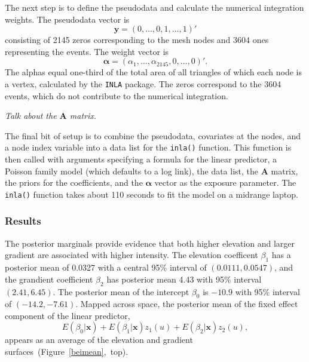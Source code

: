 \documentclass[]{interact}
\begin{document}
The next step is to define the pseudodata and calculate the numerical
integration weights. The pseudodata vector is
\begin{displaymath}
\mathbf{y} = (0, \dots, 0, 1, \dots, 1)'
\end{displaymath}
consisting of 2145 zeros corresponding to the mesh nodes and 3604 ones
representing the events. The weight vector is
\begin{displaymath}
\boldsymbol{\alpha} = (\alpha_{1}, \dots, \alpha_{2145}, 0, \dots, 0)'.
\end{displaymath}
The alphas equal one-third of the total area of all triangles of which each
node is a vertex, calculated by the \texttt{INLA} package. The zeros
correspond to the 3604 events, which do not contribute to the numerical
integration.

{\it Talk about the \(\mathbf{A}\) matrix.}

The final bit of setup is to combine the pseudodata, covariates at the nodes,
and a node index variable into a data list for the \texttt{inla()} function.
This function is then called with arguments specifying a formula for the
linear predictor, a Poisson family model (which defaults to a log link), the
data list, the \(\mathbf{A}\) matrix, the priors for the coefficients, and the
\(\boldsymbol{\alpha}\) vector as the exposure parameter. The \texttt{inla()}
function takes about 110 seconds to fit the model on a midrange laptop.


\subsubsection{Results}

The posterior marginals provide evidence that both higher elevation and larger
gradient are associated with higher intensity. The elevation coefficent
\(\beta_{1}\) has a posterior mean of 0.0327 with a central 95\% interval of
\((0.0111, 0.0547)\), and the grandient coefficient \(\beta_{2}\) has posterior
mean 4.43 with 95\% interval \((2.41, 6.45)\). The posterior mean of the
intercept \(\beta_{0}\) is \(-10.9\) with 95\% interval of \((-14.2, -7.61)\).
Mapped across space, the posterior mean of the fixed effect component of the
linear predictor,
\begin{displaymath}
E(\beta_{0} | \mathbf{x}) + E(\beta_{1} | \mathbf{x}) z_{1}(u)
+ E(\beta_{2} | \mathbf{x}) z_{2}(u),
\end{displaymath}
appears as an average of the elevation and gradient
surfaces~(Figure~\ref{beimean},~top).
\end{document}
